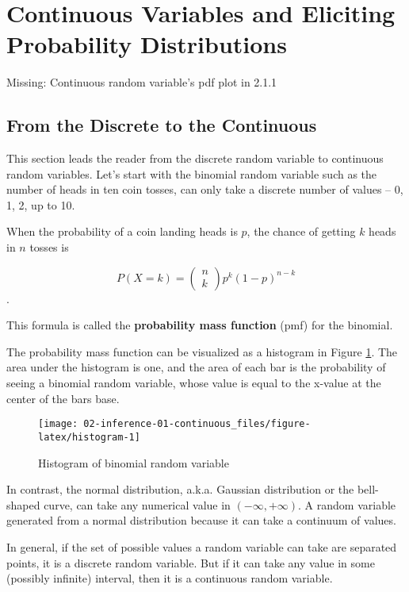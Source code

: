 \documentclass[]{book}
\theoremstyle{definition}
\theoremstyle{definition}
\theoremstyle{remark}
\begin{document}
\section{Continuous Variables and Eliciting Probability
Distributions}\label{continuous-variables-and-eliciting-probability-distributions}

Missing: Continuous random variable's pdf plot in 2.1.1

\subsection{From the Discrete to the
Continuous}\label{from-the-discrete-to-the-continuous}

This section leads the reader from the discrete random variable to
continuous random variables. Let's start with the binomial random
variable such as the number of heads in ten coin tosses, can only take a
discrete number of values -- 0, 1, 2, up to 10.

When the probability of a coin landing heads is \(p\), the chance of
getting \(k\) heads in \(n\) tosses is

\[P(X = k) = \left( \begin{array}{c} n \\ k \end{array} \right) p^k (1-p)^{n-k}\].

This formula is called the \textbf{probability mass function} (pmf) for
the binomial.

The probability mass function can be visualized as a histogram in Figure
\ref{fig:histogram}. The area under the histogram is one, and the area
of each bar is the probability of seeing a binomial random variable,
whose value is equal to the x-value at the center of the bars base.

\begin{figure}

{\centering \texttt{[image: 02-inference-01-continuous\_files/figure-latex/histogram-1]} 

}

\caption{Histogram of binomial random variable}\label{fig:histogram}
\end{figure}

In contrast, the normal distribution, a.k.a. Gaussian distribution or
the bell-shaped curve, can take any numerical value in
\((-\infty,+\infty)\). A random variable generated from a normal
distribution because it can take a continuum of values.

In general, if the set of possible values a random variable can take are
separated points, it is a discrete random variable. But if it can take
any value in some (possibly infinite) interval, then it is a continuous
random variable.
\end{document}
